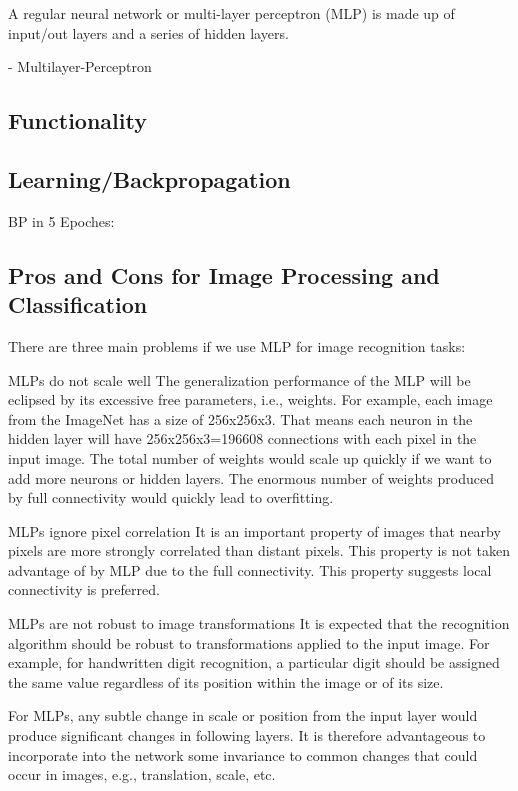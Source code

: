 \documentclass{sig-alternate-05-2015}
\begin{document}
A regular neural network or multi-layer perceptron (MLP) is made up of input/out layers and a series of hidden layers. 





- Multilayer-Perceptron


\subsection{Functionality}
\subsection{Learning/Backpropagation}

BP in 5 Epoches: \cite{ijcai2011}
\subsection{Pros and Cons for Image Processing and Classification}
There are three main problems if we use MLP for image recognition tasks:


MLPs do not scale well
The generalization performance of the MLP will be eclipsed by its excessive free parameters, i.e., weights. For example, each image from the ImageNet  has a size of 256x256x3. That means each neuron in the hidden layer will have 256x256x3=196608 connections with each pixel in the input image. The total number of weights would scale up quickly if we want to add more neurons or hidden layers. The enormous number of weights produced by full connectivity would quickly lead to overfitting.


MLPs ignore pixel correlation
It is an important property of images that nearby pixels are more strongly correlated than distant pixels. This property is not taken advantage of by MLP due to the full connectivity. This property suggests local connectivity is preferred.

MLPs are not robust to image transformations
It is expected that the recognition algorithm should be robust to transformations applied to the input image. For example, for handwritten digit recognition, a particular digit should be assigned the same value regardless of its position within the image or of its size.

For MLPs, any subtle change in scale or position from the input layer would produce significant changes in following layers. It is therefore advantageous to incorporate into the network some invariance to common changes that could occur in images, e.g., translation, scale, etc.
\end{document}
